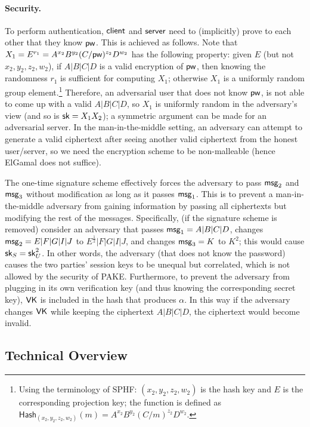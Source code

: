 \paragraph{Security.}
To perform authentication, $\mathsf{client}$ and $\mathsf{server}$ need to (implicitly) prove to each other that they know $\mathsf{pw}$. This is achieved as follows. Note that $X_1 = E^{r_1} = A^{x_2}B^{y_2}(C/\mathsf{pw})^{z_2}D^{w_2}$ has the following property: given $E$ (but not $x_2,y_2,z_2,w_2$), if $A|B|C|D$ is a valid encryption of $\mathsf{pw}$, then knowing the randomness $r_1$ is sufficient for computing $X_1$; otherwise $X_1$ is a uniformly random group element.\footnote{Using the terminology of SPHF: $(x_2,y_2,z_2,w_2)$ is the hash key and $E$ is the corresponding projection key; the function is defined as $\mathsf{Hash}_{(x_2,y_2,z_2,w_2)}(m) = A^{x_2}B^{y_2}(C/m)^{z_2}D^{w_2}$.} Therefore, an adversarial user that does not know $\mathsf{pw}$, is not able to come up with a valid $A|B|C|D$, so $X_1$ is uniformly random in the adversary's view (and so is $\mathsf{sk} = X_1X_2$); a symmetric argument can be made for an adversarial server. In the man-in-the-middle setting, an adversary can attempt to generate a valid ciphertext after seeing another valid ciphertext from the honest user/server, so we need the encryption scheme to be non-malleable (hence ElGamal does not suffice).

The one-time signature scheme effectively forces the adversary to pass $\mathsf{msg}_{2}$ and $\mathsf{msg}_{3}$ without modification as long as it passes $\mathsf{msg}_{1}$. This is to prevent a man-in-the-middle adversary from gaining information by passing all ciphertexts but modifying the rest of the messages. Specifically, (if the signature scheme is removed) consider an adversary that passes $\mathsf{msg}_{1} = A|B|C|D$, changes $\mathsf{msg}_{2} = E|F|G|I|J$ to $E^{\frac{1}{2}}|F|G|I|J$, and changes $\mathsf{msg}_{3} = K$ to $K^2$; this would cause $\mathsf{sk}_S = \mathsf{sk}_U^2$. In other words, the adversary (that does not know the password) causes the two parties' session keys to be unequal but correlated, which is not allowed by the security of PAKE. Furthermore, to prevent the adversary from plugging in its own verification key (and thus knowing the corresponding secret key), $\mathsf{VK}$ is included in the hash that produces $\alpha$. In this way if the adversary changes $\mathsf{VK}$ while keeping the ciphertext $A|B|C|D$, the ciphertext would become invalid.

\subsection{Technical Overview}

